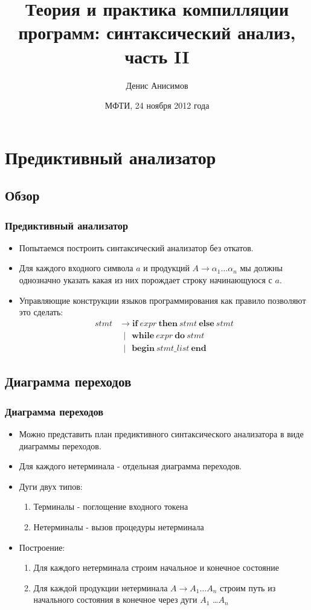 \documentclass[16pt,pdf,unicode]{beamer}
\title[Синтаксический анализ]{Теория и практика компилляции программ: синтаксический анализ, часть II}
\author[Д. Анисимов]{Денис Анисимов}
\institute[МФТИ]{Московский физико-технический университет\\
	{\tiny государственный университет}\\}
\date[24.11.2012]{МФТИ, 24 ноября 2012 года}
\begin{document}
\begin{frame}[plain]
\setcounter{framenumber}{0}
\titlepage
\end{frame}

\section{Предиктивный анализатор}
\subsection{Обзор}
\begin{frame}
\frametitle{Предиктивный анализатор}
\begin{itemize}
  \item Попытаемся построить синтаксический анализатор без откатов. 
  \item Для каждого входного символа $a$ и продукций $A \rightarrow \alpha_1\dots\alpha_n$ мы должны однозначно указать какая из них порождает строку начинающуюся с $a$.
  \item Управляющие конструкции языков программирования как правило позволяют это сделать:
    \begin{align*}
      stmt &\rightarrow \textbf{if} \: expr \: \textbf{then} \: stmt \: \textbf{else} \: stmt\\
           &\:\mid \;\, \textbf{while} \: expr \: \textbf{do} \: stmt\\
           &\:\mid \;\, \textbf{begin} \: stmt\_list \: \textbf{end}
    \end{align*}
\end{itemize}
\end{frame}

\subsection{Диаграмма переходов}
\begin{frame}
\frametitle{Диаграмма переходов}
\begin{itemize}
  \item Можно представить план предиктивного синтаксического анализатора в виде диаграммы переходов.
  \item Для каждого нетерминала - отдельная диаграмма переходов.
  \item Дуги двух типов:
    \begin{enumerate}
      \item Терминалы - поглощение входного токена
      \item Нетерминалы - вызов процедуры нетерминала
    \end{enumerate}
  \item Построение:
    \begin{enumerate}
      \item Для каждого нетерминала строим начальное и конечное состояние
      \item Для каждой продукции нетерминала $A \rightarrow A_1 \dots A_n$ строим путь из начального состояния в конечное через дуги $A_1$ \dots $A_n$
    \end{enumerate}
\end{itemize}
\end{frame}
\end{document}
